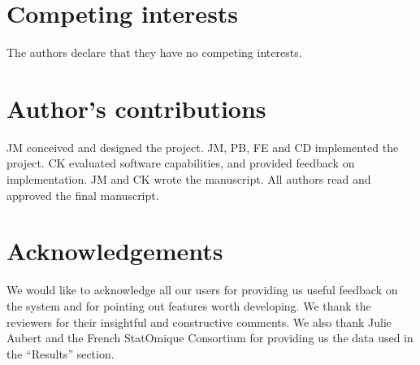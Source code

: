 \documentclass{bmcart}
\begin{document}
\begin{backmatter}

\section*{Competing interests}
The authors declare that they have no competing interests.

\section*{Author's contributions}
JM conceived and designed the project. JM, PB, FE and CD implemented the project.
CK evaluated software capabilities, and provided feedback on implementation. JM
and CK wrote the manuscript. All authors read and approved the final manuscript.

\section*{Acknowledgements}
We would like to acknowledge all our users for providing us useful feedback on
the system and for pointing out features worth developing. We thank the
reviewers for their insightful and constructive comments. We also thank Julie
Aubert and the French StatOmique Consortium for providing us the data used in
the ``Results'' section.





\end{backmatter}
\end{document}
